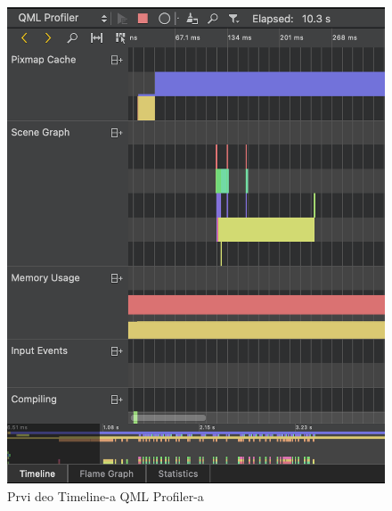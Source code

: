 \documentclass[a4paper]{article}
\begin{document}
\begin{figure}[h!]
\begin{center}
\includegraphics[scale=0.40]{qml-prof-03.png}
\end{center}
\caption{Prvi deo Timeline-a QML Profiler-a}
\label{fig: qml-03}
\end{figure}
\end{document}
